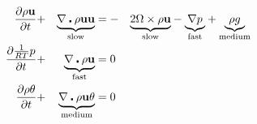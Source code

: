 \begin{alignat*}{3}
\frac{\partial\mathbf{\rho u}}{\partial t} & + & \underset{\textnormal{slow}}{\underbrace{\mathbf{\nabla\centerdot\rho u}\mathbf{u}}} & =- & \underset{\textnormal{slow}}{\underbrace{2\Omega\times\rho\mathbf{u}}}-\underset{\textnormal{fast}}{\underbrace{\nabla p}}+\underset{\text{medium}}{\underbrace{\rho g}}\\
\frac{\partial\frac{1}{RT}p}{\partial t} & + & \underset{\text{fast}}{\underbrace{\nabla\centerdot\rho\mathbf{u}}} & =0\\
\frac{\partial\rho\theta}{\partial t} & + & \underset{\text{medium}}{\underbrace{\nabla\centerdot\rho\mathbf{u}\theta}} & =0
\end{alignat*}

